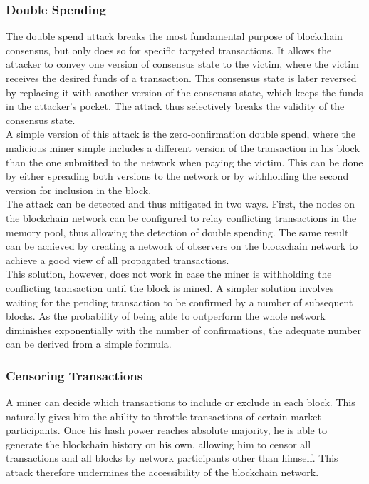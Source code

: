 \documentclass[11pt,a4paper]{article}
\begin{document}
\subsubsection{Double Spending}

The double spend attack breaks the most fundamental purpose of blockchain consensus, but only does so for specific targeted transactions. It allows the attacker to convey one version of consensus state to the victim, where the victim receives the desired funds of a transaction. This consensus state is later reversed by replacing it with another version of the consensus state, which keeps the funds in the attacker's pocket. The attack thus selectively breaks the validity of the consensus state.\\

A simple version of this attack is the zero-confirmation double spend, where the malicious miner simple includes a different version of the transaction in his block than the one submitted to the network when paying the victim. This can be done by either spreading both versions to the network or by withholding the second version for inclusion in the block.\\

The attack can be detected and thus mitigated in two ways. First, the nodes on the blockchain network can be configured to relay conflicting transactions in the memory pool, thus allowing the detection of double spending. The same result can be achieved by creating a network of observers on the blockchain network to achieve a good view of all propagated transactions.\\

This solution, however, does not work in case the miner is withholding the conflicting transaction until the block is mined. A simpler solution involves waiting for the pending transaction to be confirmed by a number of subsequent blocks. As the probability of being able to outperform the whole network diminishes exponentially with the number of confirmations, the adequate number can be derived from a simple formula.\\

\subsubsection{Censoring Transactions}

A miner can decide which transactions to include or exclude in each block. This naturally gives him the ability to throttle transactions of certain market participants. Once his hash power reaches absolute majority, he is able to generate the blockchain history on his own, allowing him to censor all transactions and all blocks by network participants other than himself. This attack therefore undermines the accessibility of the blockchain network.\\
\end{document}
